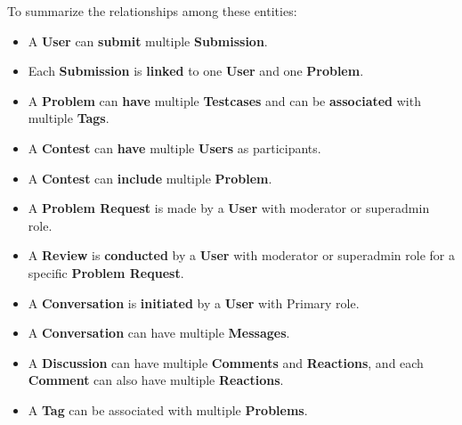 To summarize the relationships among these entities:
\begin{itemize}
    \item A \textbf{User} can \textbf{submit} multiple \textbf{Submission}.
    \item Each \textbf{Submission} is \textbf{linked} to one \textbf{User} and one \textbf{Problem}.
    \item A \textbf{Problem} can \textbf{have} multiple \textbf{Testcases} and can be \textbf{associated} with multiple \textbf{Tags}.
    \item A \textbf{Contest} can \textbf{have} multiple \textbf{Users} as participants.
    \item A \textbf{Contest} can \textbf{include} multiple \textbf{Problem}.
    \item A \textbf{Problem Request} is made by a \textbf{User} with moderator or superadmin role.
    \item A \textbf{Review} is \textbf{conducted} by a \textbf{User} with moderator or superadmin role for a specific \textbf{Problem Request}.
    \item A \textbf{Conversation} is \textbf{initiated} by a \textbf{User} with Primary role.
    \item A \textbf{Conversation} can have multiple \textbf{Messages}.
    \item A \textbf{Discussion} can have multiple \textbf{Comments} and \textbf{Reactions}, and each \textbf{Comment} can also have multiple \textbf{Reactions}.
    \item A \textbf{Tag} can be associated with multiple \textbf{Problems}.
\end{itemize}

